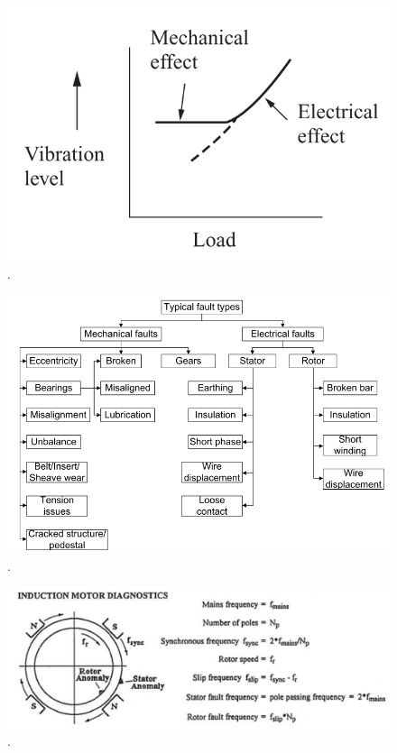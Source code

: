 \begin{figure}[H]
    \caption{.}
    \begin{center}
        \includegraphics[scale=.45]{referencial/img/fault_effect_randall_p54.png}
    \end{center}
    \label{fig:}
\end{figure}


\begin{figure}[H]
    \caption{.}
    \begin{center}
        \includegraphics[scale=.5]{referencial/img/faults_rilski_p77.png}
    \end{center}
    \label{fig:}
\end{figure}


\begin{figure}[H]
    \caption{.}
    \begin{center}
        \includegraphics[scale=.35]{referencial/img/fault_freq_randall_p55.png}
    \end{center}
    \label{fig:}
\end{figure}



